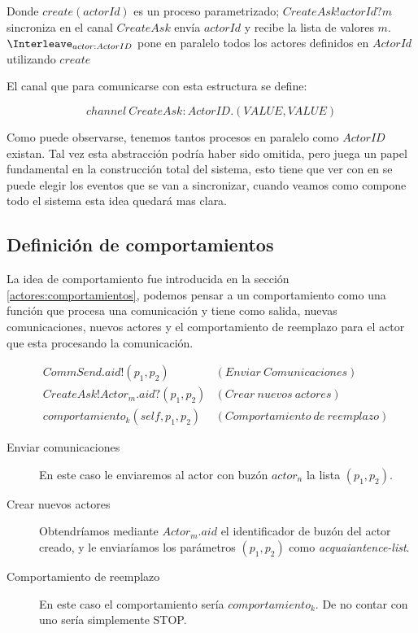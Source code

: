 Donde $create(actorId)$ es un proceso parametrizado; $CreateAsk!actorId?m$ sincroniza en el canal $CreateAsk$ envía $actorId$ y recibe la lista de valores $m$. $\Interleave_{actor : ActorID}$ pone en paralelo todos los actores definidos en $ActorId$ utilizando $create$

El canal que para comunicarse con esta estructura se define:

\[
channel\ CreateAsk:ActorID.(VALUE, VALUE)
\]

Como puede observarse, tenemos tantos procesos en paralelo como $ActorID$ existan. Tal vez esta abstracción podría haber sido omitida, pero juega un papel fundamental en la construcción total del sistema, esto tiene que ver con en \CSP se puede elegir los eventos \cite[chap.~2,p.~55]{Roscoe:1997:TPC:550448} que se van a sincronizar, cuando veamos como compone todo el sistema esta idea quedará mas clara.

\subsection{Definición de comportamientos}
La idea de comportamiento fue introducida en la sección \ref{actores:comportamientos}, podemos pensar a un comportamiento como una función que procesa una comunicación y tiene como salida, nuevas comunicaciones, nuevos actores y el comportamiento de reemplazo para el actor que esta procesando la comunicación.

\begin{align*}
&CommSend.aid!(p_1, p_2) & (Enviar\ Comunicaciones) \\ 
&CreateAsk!Actor_m.aid?(p_1, p_2) & (Crear\ nuevos\ actores)\\
&comportamiento_k(self, p_1, p_2)  & (Comportamiento\ de\ reemplazo)
\end{align*}

\begin{description}
\item [Enviar comunicaciones] En este caso le enviaremos al actor con buzón $actor_n$ la lista $(p_1, p_2)$. 
\item [Crear nuevos actores] Obtendríamos mediante $Actor_m.aid$ el identificador de buzón del actor creado, y le enviaríamos los parámetros $(p_1, p_2)$ como \textit{acquaiantence-list}.
\item [Comportamiento de reemplazo] En este caso el comportamiento sería $comportamiento_k$. De no contar con uno sería simplemente STOP.
\end{description}

